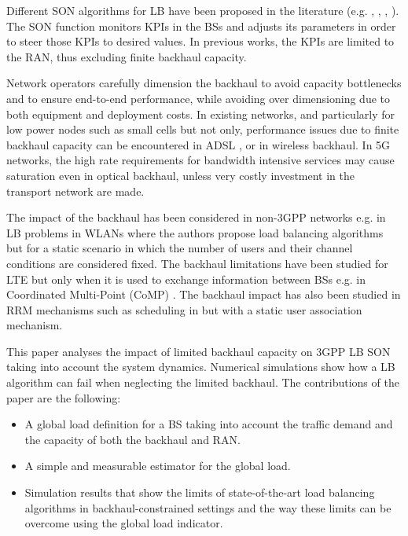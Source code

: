\documentclass[10pt,draftclsnofoot,onecolumn]{IEEEtran}
\begin{document}
Different \ac{SON} algorithms for \ac{LB} have been proposed
in the literature (e.g. \cite{khan_centralizedLB_2013}, \cite{combes_selforganizationwireless_2012}, \cite{nasri_handoveradaptation_2013}, \cite{rodriguez_loadbalancing_2011}).
The \ac{SON} function monitors \acp{KPI} in the \acp{BS} and adjusts
its parameters in order to steer those \acp{KPI} to desired values.
In previous works, the \acp{KPI} are limited to the \ac{RAN}, thus
excluding finite backhaul capacity.

Network operators carefully dimension the backhaul to avoid capacity
bottlenecks and to ensure end-to-end performance, while
avoiding over dimensioning due to both equipment and deployment
costs. In existing networks, and particularly for low power nodes
such as small cells but not only, performance issues due to
finite backhaul capacity can be encountered in \ac{ADSL}
\cite{small_cell_forum_BH}, or in wireless backhaul. In 5G networks,
the high rate requirements for bandwidth intensive services
\cite{osseiran2014scenarios} may cause saturation
even in optical backhaul, unless very costly investment in the
transport network are made. 



The impact of the backhaul has been considered in non-3GPP networks
e.g. in \ac{LB} problems in \acp{WLAN}
\cite{bejerano_fairness_wlan_2007} where the authors propose load
balancing algorithms but for a static scenario in which the number
of users and their channel conditions are considered fixed. The
backhaul limitations have been studied for LTE but only when it is
used to exchange information between BSs e.g. in Coordinated
Multi-Point (CoMP) \cite{lee_comp_2012}. The backhaul impact has also been studied in
\ac{RRM} mechanisms such as scheduling in
\cite{ghimire_impactbackhaul_2014} but with a static user
association mechanism.

This paper analyses the impact of limited backhaul capacity on 3GPP 
\ac{LB} \ac{SON} taking into account the system dynamics. 
Numerical simulations show how a \ac{LB} algorithm can fail when 
neglecting the limited backhaul.
The contributions of the paper are the following:
\begin{itemize}
\item A global load definition for a \ac{BS} taking into
account the traffic demand and the capacity of both the backhaul and \ac{RAN}.
\item A simple and measurable estimator for the global load.
\item Simulation results that show the limits of state-of-the-art load
balancing algorithms in backhaul-constrained settings and the way
these limits can be overcome using the global load indicator.
\end{itemize}
\end{document}
